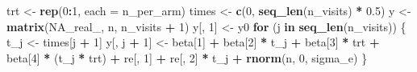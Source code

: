 \documentclass[
  11pt,
]{article}
\newenvironment{Shaded}{\begin{snugshade}}{\end{snugshade}}
\newcommand{\AttributeTok}[1]{\textcolor[rgb]{0.13,0.29,0.53}{#1}}
\newcommand{\ConstantTok}[1]{\textcolor[rgb]{0.56,0.35,0.01}{#1}}
\newcommand{\ControlFlowTok}[1]{\textcolor[rgb]{0.13,0.29,0.53}{\textbf{#1}}}
\newcommand{\DecValTok}[1]{\textcolor[rgb]{0.00,0.00,0.81}{#1}}
\newcommand{\FloatTok}[1]{\textcolor[rgb]{0.00,0.00,0.81}{#1}}
\newcommand{\FunctionTok}[1]{\textcolor[rgb]{0.13,0.29,0.53}{\textbf{#1}}}
\newcommand{\NormalTok}[1]{#1}
\newcommand{\OtherTok}[1]{\textcolor[rgb]{0.56,0.35,0.01}{#1}}
\newcommand{\SpecialCharTok}[1]{\textcolor[rgb]{0.81,0.36,0.00}{\textbf{#1}}}
\begin{document}
\begin{Shaded}
\begin{Highlighting}[]
\NormalTok{  trt }\OtherTok{\textless{}{-}} \FunctionTok{rep}\NormalTok{(}\DecValTok{0}\SpecialCharTok{:}\DecValTok{1}\NormalTok{, }\AttributeTok{each =}\NormalTok{ n\_per\_arm)}
\NormalTok{  times }\OtherTok{\textless{}{-}} \FunctionTok{c}\NormalTok{(}\DecValTok{0}\NormalTok{, }\FunctionTok{seq\_len}\NormalTok{(n\_visits) }\SpecialCharTok{*} \FloatTok{0.5}\NormalTok{)}
\NormalTok{  y }\OtherTok{\textless{}{-}} \FunctionTok{matrix}\NormalTok{(}\ConstantTok{NA\_real\_}\NormalTok{, n, n\_visits }\SpecialCharTok{+} \DecValTok{1}\NormalTok{)}
\NormalTok{  y[, }\DecValTok{1}\NormalTok{] }\OtherTok{\textless{}{-}}\NormalTok{ y0}
  \ControlFlowTok{for}\NormalTok{ (j }\ControlFlowTok{in} \FunctionTok{seq\_len}\NormalTok{(n\_visits)) \{}
\NormalTok{    t\_j }\OtherTok{\textless{}{-}}\NormalTok{ times[j }\SpecialCharTok{+} \DecValTok{1}\NormalTok{]}
\NormalTok{    y[, j }\SpecialCharTok{+} \DecValTok{1}\NormalTok{] }\OtherTok{\textless{}{-}}\NormalTok{ beta[}\DecValTok{1}\NormalTok{] }\SpecialCharTok{+}\NormalTok{ beta[}\DecValTok{2}\NormalTok{] }\SpecialCharTok{*}\NormalTok{ t\_j }\SpecialCharTok{+}
\NormalTok{      beta[}\DecValTok{3}\NormalTok{] }\SpecialCharTok{*}\NormalTok{ trt }\SpecialCharTok{+}\NormalTok{ beta[}\DecValTok{4}\NormalTok{] }\SpecialCharTok{*}\NormalTok{ (t\_j }\SpecialCharTok{*}\NormalTok{ trt) }\SpecialCharTok{+}
\NormalTok{      re[, }\DecValTok{1}\NormalTok{] }\SpecialCharTok{+}\NormalTok{ re[, }\DecValTok{2}\NormalTok{] }\SpecialCharTok{*}\NormalTok{ t\_j }\SpecialCharTok{+} \FunctionTok{rnorm}\NormalTok{(n, }\DecValTok{0}\NormalTok{, sigma\_e)}
\NormalTok{  \}}


\end{Highlighting}
\end{Shaded}
\end{document}
